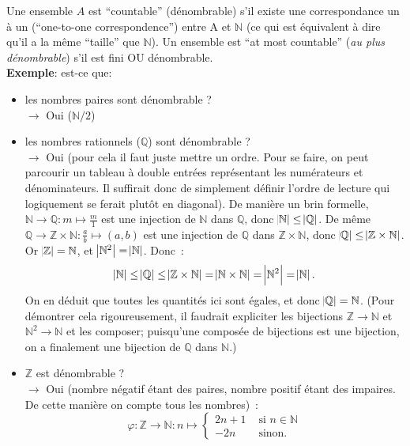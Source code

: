 \documentclass[a4paper,12pt]{article}
\begin{document}
  Une ensemble $A$ est ``countable'' (dénombrable) s'il existe une correspondance un à un (``one-to-one correspondence'') entre A et $\mathbb{N}$ (ce qui est équivalent à dire qu'il a la même ``taille'' que $\mathbb{N}$). Un ensemble est ``at most countable'' (\textit{au plus dénombrable}) s'il est fini OU dénombrable.\\
  \textbf{Exemple}: est-ce que:
  \begin{itemize}
    \item les nombres paires sont dénombrable ?\\
      $\rightarrow$ Oui ($\mathbb{N} / 2$)

    \item les nombres rationnels ($\mathbb{Q}$) sont dénombrable ?\\
      $\rightarrow$ Oui (pour cela il faut juste mettre un ordre.  Pour se faire, on peut parcourir un tableau à double entrées représentant les numérateurs et dénominateurs. Il suffirait donc de simplement définir l'ordre de lecture qui logiquement se ferait plutôt en diagonal).  %
      De manière un brin formelle, $\mathbb N \to \mathbb Q : m \mapsto \frac m1$ est une injection de $\mathbb N$ dans $\mathbb Q$, donc $\abs {\mathbb N} \leq \abs {\mathbb Q}$.
      De même $\mathbb Q \to \mathbb Z \times \mathbb N : \frac ab \mapsto (a, b)$ est une injection de $\mathbb Q$ dans $\mathbb Z \times \mathbb N$, donc $\abs {\mathbb Q} \leq \abs {\mathbb Z \times \mathbb N}$. Or $\abs {\mathbb Z} = \mathbb N$, et $\abs {\mathbb N^2} = \abs {\mathbb N}$. Donc~: 
      \[\abs {\mathbb N} \leq \abs {\mathbb Q} \leq \abs {\mathbb Z \times \mathbb N} = \abs {\mathbb N \times \mathbb N} = \abs {\mathbb N^2} = \abs {\mathbb N}.\]
      On en déduit que toutes les quantités ici sont égales, et donc $\abs {\mathbb Q} = \mathbb N$. (Pour démontrer cela rigoureusement, il faudrait expliciter les bijections $\mathbb Z \to \mathbb N$ et $\mathbb N^2 \to \mathbb N$ et les composer; puisqu'une composée de bijections est une bijection, on a finalement une bijection de $\mathbb Q$ dans $\mathbb N$.)

    \item $\mathbb{Z}$ est dénombrable ?\\
      $\rightarrow$ Oui (nombre négatif étant des paires, nombre positif étant des impaires. De cette manière on compte tous les nombres)~:
      \[\varphi : \mathbb Z \to \mathbb N : n \mapsto \begin{cases}2n+1 &\text{ si } n \in \mathbb N\\-2n &\text{ sinon.}\end{cases}\]
  \end{itemize}
\end{document}
